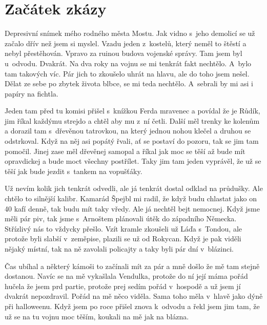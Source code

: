 
\chapter{Začátek zkázy}

Depresivní snímek mého rodného města Mostu. Jak vidno s~jeho demolicí se už
začalo dřív než jsem si myslel. Vzadu jeden z~kostelů, který neměl to štěstí a
nebyl přestěhován. Vpravo za ruinou budova vojenské správy. Tam jsem byl
u~odvodu. Dvakrát. Na dva roky na vojnu se mi tenkrát fakt nechtělo. A~bylo tam
takových víc. Pár jich to zkoušelo uhrát na hlavu, ale do toho jsem nešel.
Dělat ze sebe po zbytek života blbce, se mi teda nechtělo. A~sebrali by mi asi
i papíry na fichtla.

Jeden tam před tu komisi přišel s~knížkou Ferda mravenec a povídal že je Růdík,
jim říkal každýmu strejdo a chtěl aby mu z~ní četli. Další měl trenky ke
kolenům a dorazil tam s~dřevěnou tatrovkou, na který jednou nohou klečel a
druhou se odstrkoval. Když na něj asi popátý řvali, ať se postaví do pozoru,
tak se jim tam pomočil. Jinej zase měl dřevěnej samopal a říkal jak moc se těší
až bude mít opravdickej a bude moct všechny postřílet. Taky jim tam jeden
vyprávěl, že už se těší jak bude jezdit s~tankem na vopušťáky.

Už nevím kolik jich tenkrát odvedli, ale já tenkrát dostal odklad na průdušky.
Ale chtělo to silnější kalibr. Kamarád Špejbl mi radil, že když budu chlastat
jako on 40 kafí denně, tak budu mít taky vředy. Ale já nechtěl bejt nemocnej.
Když jsme měli pár piv, tak jsme s~Arnoštem plánovali útěk do západního
Německa. Střízlivý nás to vždycky přešlo. Vzít kramle zkoušeli už Láďa
s~Tondou, ale protože byli slabší v~zeměpise, plazili se už od Rokycan. Když je
pak viděli nějaký místní, tak na ně zavolali policajty a taky byli pár dní
v~blázinci.

Čas ubíhal a některý kámoši to začínali mít za pár a mně došlo že mě tam stejně
dostanou. Navíc se na mě vykašlala Vendulka, protože do ní její máma pořád
hučela že jsem prd partie, protože prej sedím pořád v~hospodě a už jsem jí
dvakrát nepozdravil. Pořád na mě něco viděla. Sama toho měla v~hlavě jako dýně
při halloweenu. Když jsem po roce přišel znova k~odvodu a řekl jsem jim tam, že
už se na tu vojnu moc těším, koukali na mě jak na blázna.

